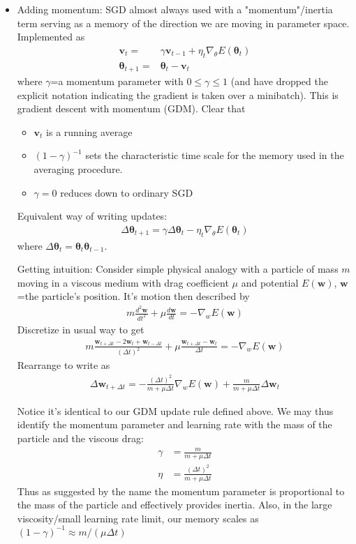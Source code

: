 \documentclass[norsk,a4paper,11pt]{article}
\begin{document}
\begin{itemize}
		\item Adding momentum:
		SGD almost always used with a "momentum"/inertia term serving as a memory of the direction we are moving in parameter space. Implemented as
		\begin{align}
			\mathbf{v}_t =& \gamma \mathbf{v}_{t-1} + \eta_t \nabla_\theta E(\bm{\theta}_t) \\
			\bm{\theta}_{t+1} =& \bm{\theta}_t - \mathbf{v}_t
		\end{align}
		where $\gamma$=a momentum parameter with $0 \leq \gamma \leq 1$ (and have dropped the explicit notation indicating the gradient is taken over a minibatch). This is gradient descent with momentum (GDM). Clear that 
		\begin{itemize}
			\item $\mathbf{v}_t$ is a running average
			\item $(1-\gamma)^{-1}$ sets the characteristic time scale for the memory used in the averaging procedure.  
			\item $\gamma=0$ reduces down to ordinary SGD
		\end{itemize}
		Equivalent way of writing updates:
		\begin{align}
			\Delta \bm{\theta}_{t+1} = \gamma \Delta \bm{\theta}_t - \eta_t \nabla_\theta E(\bm{\theta}_t)
		\end{align}
		where $\Delta \bm{\theta}_t =  \bm{\theta}_t \bm{\theta}_{t-1} $.

		Getting intuition: Consider simple physical analogy with a particle of mass $m$ moving in a viscous medium with drag coefficient $\mu$ and potential $E(\mathbf{w})$, $\mathbf{w}$=the particle's position. It's motion then described by
		\begin{align}
			m\frac{d^2 \mathbf{w}}{dt^2} + \mu \frac{d\mathbf{w}}{dt}
			= - \nabla_w E(\mathbf{w})
		\end{align}
		Discretize in usual way to get
		\begin{align}
			m\frac{\mathbf{w}_{t+\Delta t} -2\mathbf{w}_t + \mathbf{w}_{t-\Delta t}}{(\Delta t)^2} + \mu \frac{\mathbf{w}_{t + \Delta t} - \mathbf{w}_t}{\Delta t} = - \nabla_w E(\mathbf{w})
		\end{align}
		Rearrange to write as
		\begin{align}
			\Delta \mathbf{w}_{t + \Delta t} = - \frac{(\Delta t)^2}{m + \mu\Delta t} \nabla_w E(\mathbf{w}) + \frac{m}{m+\mu\Delta t} \Delta \mathbf{w}_t
		\end{align}

		Notice it's identical to our GDM update rule defined above. We may thus identify the momentum parameter and learning rate with the mass of the particle and the viscous drag:
		\begin{align}
			\gamma &= \frac{m}{m+ \mu \Delta t} \\
			\eta &= \frac{(\Delta t)^2}{m+\mu \Delta t}
		\end{align}
		Thus as suggested by the name the momentum parameter is proportional to the mass of the particle and effectively provides inertia. Also, in the large viscosity/small learning rate limit, our memory scales as $(1-\gamma)^{-1} \approx m/(\mu \Delta t)$


\end{itemize}
\end{document}
